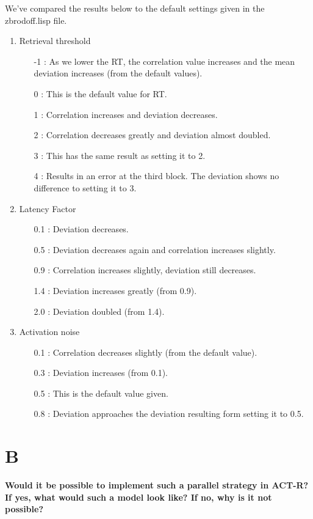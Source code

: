 \documentclass[11pt,a4paper,titlepage]{article}
\begin{document}
We've compared the results below to the default settings given in the zbrodoff.lisp file.
\begin{enumerate}
\item Retrieval threshold
  \begin{enumerate}
  \item [-1]: As we lower the RT, the correlation value increases and the mean deviation increases (from the default values).
  \item [0]: This is the default value for RT.
  \item [1]: Correlation increases and deviation decreases.
  \item [2]: Correlation decreases greatly and deviation almost doubled.
  \item [3]: This has the same result as setting it to 2.
  \item [4]: Results in an error at the third block. The deviation shows no difference to setting it to 3.
  \end{enumerate}
\item Latency Factor
  \begin{enumerate}
  \item [0.1]: Deviation decreases.
  \item [0.5]: Deviation decreases again and correlation increases slightly.
  \item [0.9]: Correlation increases slightly, deviation still decreases.
  \item [1.4]: Deviation increases greatly (from 0.9).
    \item [2.0]: Deviation doubled (from 1.4).
    \end{enumerate}
  \item Activation noise
    \begin{enumerate}
    \item [0.1]: Correlation decreases slightly (from the default value).
    \item [0.3]: Deviation increases (from 0.1).
    \item [0.5]: This is the default value given.
      \item [0.8]: Deviation approaches the deviation resulting form setting it to 0.5.
      \end{enumerate}
\end{enumerate}

\section{B}
\textbf{Would it be possible to implement such a parallel strategy in ACT-R?
If yes, what would such a model look like? If no, why is it not
possible?}
\end{document}
